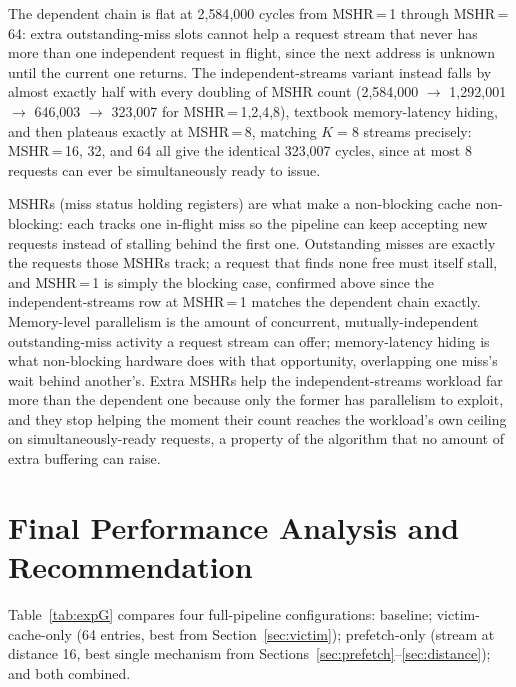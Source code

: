 \documentclass[11pt]{article}
\begin{document}


The dependent chain is flat at 2{,}584{,}000 cycles from MSHR\,=\,1 through
MSHR\,=\,64: extra outstanding-miss slots cannot help a request stream that
never has more than one independent request in flight, since the next
address is unknown until the current one returns. The independent-streams
variant instead falls by almost exactly half with every doubling of MSHR
count (2{,}584{,}000 $\to$ 1{,}292{,}001 $\to$ 646{,}003 $\to$ 323{,}007 for
MSHR\,=\,1,2,4,8), textbook memory-latency hiding, and then plateaus exactly
at MSHR\,=\,8, matching $K=8$ streams precisely: MSHR\,=\,16, 32, and 64 all
give the identical 323{,}007 cycles, since at most 8 requests can ever be
simultaneously ready to issue.

MSHRs (miss status holding registers) are what make a non-blocking cache
non-blocking: each tracks one in-flight miss so the pipeline can keep
accepting new requests instead of stalling behind the first one.
Outstanding misses are exactly the requests those MSHRs track; a request
that finds none free must itself stall, and MSHR\,=\,1 is simply the
blocking case, confirmed above since the independent-streams row at
MSHR\,=\,1 matches the dependent chain exactly. Memory-level parallelism is
the amount of concurrent, mutually-independent outstanding-miss activity a
request stream can offer; memory-latency hiding is what non-blocking
hardware does with that opportunity, overlapping one miss's wait behind
another's. Extra MSHRs help the independent-streams workload far more than
the dependent one because only the former has parallelism to exploit, and
they stop helping the moment their count reaches the workload's own ceiling
on simultaneously-ready requests, a property of the algorithm that no amount
of extra buffering can raise.

\section{Final Performance Analysis and Recommendation}

Table~\ref{tab:expG} compares four full-pipeline configurations: baseline;
victim-cache-only (64 entries, best from Section~\ref{sec:victim});
prefetch-only (stream at distance 16, best single mechanism from
Sections~\ref{sec:prefetch}--\ref{sec:distance}); and both combined.
\end{document}
